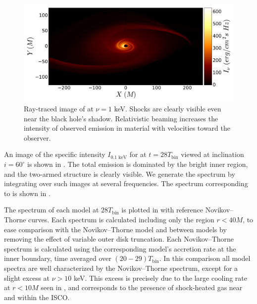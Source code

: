 \begin{figure}
	\begin{center}
	\includegraphics[width=\textwidth]{figures/minidisk/q011_m3_im.pdf}
	\end{center}
	\caption{ Ray-traced image of  at $\nu =   1$ keV. Shocks are clearly visible even near the black hole's shadow.  Relativistic beaming increases the intensity of observed emission in material with velocities toward the observer.}
\end{figure}

An image of the specific intensity $I_{0.1\text{ keV}}$ for  at $t=28 T_\text{bin}$ viewed at inclination $i=60^\circ$ is shown in .  The total emission is dominated by the bright inner region, and the two-armed structure is clearly visible. We generate the spectrum by integrating over such images at several frequencies.  The spectrum corresponding to  is shown in . 

The spectrum of each model at $28 T_\text{bin}$ is plotted in  with reference Novikov--Thorne curves.  Each spectrum is calculated including only the region $r<40M$, to ease comparison with the Novikov--Thorne model and between models by removing the effect of variable outer disk truncation.  Each Novikov--Thorne spectrum is calculated using the corresponding model's accretion rate at the inner boundary, time averaged over $(20-29)T_\text{bin}$.  In this comparison all model spectra are well characterized by the Novikov--Thorne spectrum, except for a slight excess at $\nu > 10$ keV.  This excess is precisely due to the large cooling rate at $r<10M$ seen in , and corresponds to the presence of shock-heated gas near and within the ISCO.  

